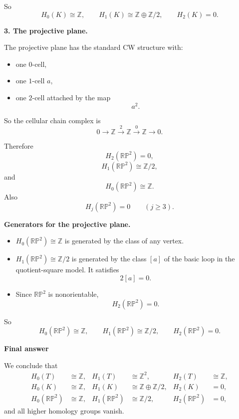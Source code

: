 \begin{solution}
So
\[
H_0(K)\cong \mathbb Z,\qquad
H_1(K)\cong \mathbb Z\oplus \mathbb Z/2,\qquad
H_2(K)=0.
\]

\par

\textbf{3. The projective plane.}

The projective plane has the standard CW structure with:

\begin{itemize}
	\item one \(0\)-cell,
	\item one \(1\)-cell \(a\),
	\item one \(2\)-cell attached by the map
	\[
	a^2.
	\]
\end{itemize}

So the cellular chain complex is
\[
0 \longrightarrow \mathbb Z
\xrightarrow{2}
\mathbb Z
\xrightarrow{0}
\mathbb Z
\longrightarrow 0.
\]

Therefore
\[
H_2(\mathbb{RP}^2)=0,
\]
\[
H_1(\mathbb{RP}^2)\cong \mathbb Z/2,
\]
and
\[
H_0(\mathbb{RP}^2)\cong \mathbb Z.
\]
Also
\[
H_j(\mathbb{RP}^2)=0 \qquad (j\ge 3).
\]

\par

\textbf{Generators for the projective plane.}

\begin{itemize}
	\item \(H_0(\mathbb{RP}^2)\cong \mathbb Z\) is generated by the class of any vertex.
	\item \(H_1(\mathbb{RP}^2)\cong \mathbb Z/2\) is generated by the class \([a]\) of the basic loop in the quotient-square model. It satisfies
	\[
	2[a]=0.
	\]
	\item Since \(\mathbb{RP}^2\) is nonorientable,
	\[
	H_2(\mathbb{RP}^2)=0.
	\]
\end{itemize}

So
\[
H_0(\mathbb{RP}^2)\cong \mathbb Z,\qquad
H_1(\mathbb{RP}^2)\cong \mathbb Z/2,\qquad
H_2(\mathbb{RP}^2)=0.
\]


\medskip
\noindent\textbf{Final answer}\par
\smallskip


We conclude that
\[
\boxed{
	\begin{aligned}
		H_0(T)&\cong \mathbb Z, &
		H_1(T)&\cong \mathbb Z^2, &
		H_2(T)&\cong \mathbb Z,\\[0.5ex]
		H_0(K)&\cong \mathbb Z, &
		H_1(K)&\cong \mathbb Z\oplus \mathbb Z/2, &
		H_2(K)&=0,\\[0.5ex]
		H_0(\mathbb{RP}^2)&\cong \mathbb Z, &
		H_1(\mathbb{RP}^2)&\cong \mathbb Z/2, &
		H_2(\mathbb{RP}^2)&=0,
\end{aligned}}
\]
and all higher homology groups vanish.


\end{solution}
